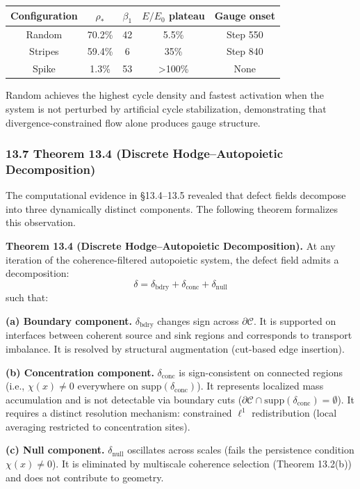 \documentclass[
]{article}
\begin{document}
\begin{longtable}[]{@{}ccccc@{}}
\toprule\noalign{}
Configuration & \(\rho_*\) & \(\beta_1\) & \(E/E_0\) plateau & Gauge
onset \\
\midrule\noalign{}
\endhead
\bottomrule\noalign{}
\endlastfoot
Random & 70.2\% & 42 & 5.5\% & Step 550 \\
Stripes & 59.4\% & 6 & 35\% & Step 840 \\
Spike & 1.3\% & 53 & \textgreater100\% & None \\
\end{longtable}

Random achieves the highest cycle density and fastest activation when
the system is not perturbed by artificial cycle stabilization,
demonstrating that divergence-constrained flow alone produces gauge
structure.

\subsubsection{13.7 Theorem 13.4 (Discrete Hodge--Autopoietic
Decomposition)}\label{theorem-13.4-discrete-hodgeautopoietic-decomposition}

The computational evidence in §13.4--13.5 revealed that defect fields
decompose into three dynamically distinct components. The following
theorem formalizes this observation.

\textbf{Theorem 13.4 (Discrete Hodge--Autopoietic Decomposition).} At
any iteration of the coherence-filtered autopoietic system, the defect
field admits a decomposition:
\[\delta = \delta_{\mathrm{bdry}} + \delta_{\mathrm{conc}} + \delta_{\mathrm{null}}\]
such that:

\textbf{(a) Boundary component.} \(\delta_{\mathrm{bdry}}\) changes sign
across \(\partial\mathcal{C}\). It is supported on interfaces between
coherent source and sink regions and corresponds to transport imbalance.
It is resolved by structural augmentation (cut-based edge insertion).

\textbf{(b) Concentration component.} \(\delta_{\mathrm{conc}}\) is
sign-consistent on connected regions (i.e., \(\chi(x) \neq 0\)
everywhere on \(\mathrm{supp}(\delta_{\mathrm{conc}})\)). It represents
localized mass accumulation and is not detectable via boundary cuts
(\(\partial\mathcal{C} \cap \mathrm{supp}(\delta_{\mathrm{conc}}) = \emptyset\)).
It requires a distinct resolution mechanism: constrained \(\ell^1\)
redistribution (local averaging restricted to concentration sites).

\textbf{(c) Null component.} \(\delta_{\mathrm{null}}\) oscillates
across scales (fails the persistence condition \(\chi(x) \neq 0\)). It
is eliminated by multiscale coherence selection (Theorem 13.2(b)) and
does not contribute to geometry.
\end{document}
